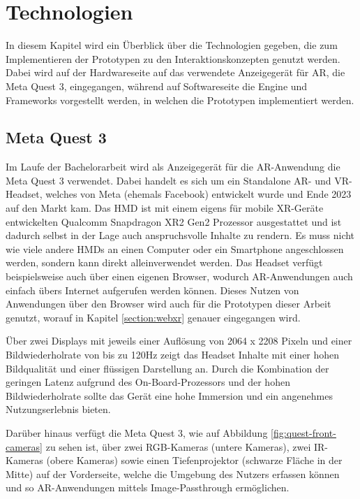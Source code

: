 \chapter{Technologien}

In diesem Kapitel wird ein Überblick über die Technologien gegeben, die zum Implementieren der Prototypen zu den Interaktionskonzepten genutzt werden.
Dabei wird auf der Hardwareseite auf das verwendete Anzeigegerät für AR, die Meta Quest 3, eingegangen, während auf Softwareseite die Engine und Frameworks vorgestellt werden, in welchen die Prototypen implementiert werden.

\section{Meta Quest 3}

Im Laufe der Bachelorarbeit wird als Anzeigegerät für die AR-Anwendung die Meta Quest 3 verwendet.
Dabei handelt es sich um ein Standalone AR- und VR-Headset, welches von Meta (ehemals Facebook) entwickelt wurde und Ende 2023 auf den Markt kam.
Das HMD ist mit einem eigens für mobile XR-Geräte entwickelten Qualcomm Snapdragon XR2 Gen2 Prozessor ausgestattet und ist dadurch selbst in der Lage auch anspruchsvolle Inhalte zu rendern.
Es muss nicht wie viele andere HMDs an einen Computer oder ein Smartphone angeschlossen werden, sondern kann direkt alleinverwendet werden.
Das Headset verfügt beispielsweise auch über einen eigenen Browser, wodurch AR-Anwendungen auch einfach übers Internet aufgerufen werden können.
Dieses Nutzen von Anwendungen über den Browser wird auch für die Prototypen dieser Arbeit genutzt, worauf in Kapitel \ref{section:webxr} genauer eingegangen wird.

Über zwei Displays mit jeweils einer Auflösung von 2064 x 2208 Pixeln und einer Bildwiederholrate von bis zu 120Hz zeigt das Headset Inhalte mit einer hohen Bildqualität und einer flüssigen Darstellung an.
Durch die Kombination der geringen Latenz aufgrund des On-Board-Prozessors und der hohen Bildwiederholrate sollte das Gerät eine hohe Immersion und ein angenehmes Nutzungserlebnis bieten.

\newpage

Darüber hinaus verfügt die Meta Quest 3, wie auf Abbildung \ref{fig:quest-front-cameras} zu sehen ist, über zwei RGB-Kameras (untere Kameras), zwei IR-Kameras (obere Kameras) sowie einen Tiefenprojektor (schwarze Fläche in der Mitte) auf der Vorderseite, welche die Umgebung des Nutzers erfassen können und so AR-Anwendungen mittels Image-Passthrough ermöglichen.

